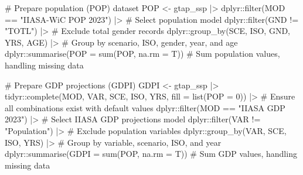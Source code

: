 \documentclass[
  letterpaper,
  DIV=11,
  numbers=noendperiod]{scrartcl}
\newenvironment{Shaded}{}{}
\newcommand{\AttributeTok}[1]{\textcolor[rgb]{0.00,0.34,0.68}{#1}}
\newcommand{\CommentTok}[1]{\textcolor[rgb]{0.54,0.53,0.53}{#1}}
\newcommand{\DecValTok}[1]{\textcolor[rgb]{0.69,0.50,0.00}{#1}}
\newcommand{\FunctionTok}[1]{\textcolor[rgb]{0.39,0.29,0.61}{#1}}
\newcommand{\NormalTok}[1]{\textcolor[rgb]{0.12,0.11,0.11}{#1}}
\newcommand{\OtherTok}[1]{\textcolor[rgb]{0.00,0.43,0.16}{#1}}
\newcommand{\SpecialCharTok}[1]{\textcolor[rgb]{0.24,0.68,0.91}{#1}}
\newcommand{\StringTok}[1]{\textcolor[rgb]{0.75,0.01,0.01}{#1}}
\begin{document}
\begin{Shaded}
\begin{Highlighting}[]
\CommentTok{\# Prepare population (POP) dataset}
\NormalTok{POP }\OtherTok{\textless{}{-}}\NormalTok{ gtap\_ssp }\SpecialCharTok{|\textgreater{}}
\NormalTok{  dplyr}\SpecialCharTok{::}\FunctionTok{filter}\NormalTok{(MOD }\SpecialCharTok{==} \StringTok{"IIASA{-}WiC POP 2023"}\NormalTok{) }\SpecialCharTok{|\textgreater{}}               \CommentTok{\# Select population model}
\NormalTok{  dplyr}\SpecialCharTok{::}\FunctionTok{filter}\NormalTok{(GND }\SpecialCharTok{!=} \StringTok{"TOTL"}\NormalTok{) }\SpecialCharTok{|\textgreater{}}                             \CommentTok{\# Exclude total gender records}
\NormalTok{  dplyr}\SpecialCharTok{::}\FunctionTok{group\_by}\NormalTok{(SCE, ISO, GND, YRS, AGE) }\SpecialCharTok{|\textgreater{}}                \CommentTok{\# Group by scenario, ISO, gender, year, and age}
\NormalTok{  dplyr}\SpecialCharTok{::}\FunctionTok{summarise}\NormalTok{(}\AttributeTok{POP =} \FunctionTok{sum}\NormalTok{(POP, }\AttributeTok{na.rm =}\NormalTok{ T))                 }\CommentTok{\# Sum population values, handling missing data}

\CommentTok{\# Prepare GDP projections (GDPI)}
\NormalTok{GDPI }\OtherTok{\textless{}{-}}\NormalTok{ gtap\_ssp }\SpecialCharTok{|\textgreater{}} 
\NormalTok{  tidyr}\SpecialCharTok{::}\FunctionTok{complete}\NormalTok{(MOD, VAR, SCE, ISO, YRS, }\AttributeTok{fill =} \FunctionTok{list}\NormalTok{(}\AttributeTok{POP =} \DecValTok{0}\NormalTok{)) }\SpecialCharTok{|\textgreater{}} \CommentTok{\# Ensure all combinations exist with default values}
\NormalTok{  dplyr}\SpecialCharTok{::}\FunctionTok{filter}\NormalTok{(MOD }\SpecialCharTok{==} \StringTok{"IIASA GDP 2023"}\NormalTok{) }\SpecialCharTok{|\textgreater{}}                         \CommentTok{\# Select IIASA GDP projections model}
\NormalTok{  dplyr}\SpecialCharTok{::}\FunctionTok{filter}\NormalTok{(VAR }\SpecialCharTok{!=} \StringTok{"Population"}\NormalTok{) }\SpecialCharTok{|\textgreater{}}                             \CommentTok{\# Exclude population variables}
\NormalTok{  dplyr}\SpecialCharTok{::}\FunctionTok{group\_by}\NormalTok{(VAR, SCE, ISO, YRS) }\SpecialCharTok{|\textgreater{}}                            \CommentTok{\# Group by variable, scenario, ISO, and year}
\NormalTok{  dplyr}\SpecialCharTok{::}\FunctionTok{summarise}\NormalTok{(}\AttributeTok{GDPI =} \FunctionTok{sum}\NormalTok{(POP, }\AttributeTok{na.rm =}\NormalTok{ T))                      }\CommentTok{\# Sum GDP values, handling missing data}


\end{Highlighting}
\end{Shaded}
\end{document}

